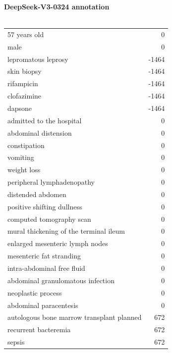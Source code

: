 \begin{figure}[!htbp]
    \begin{minipage}[!htbp]{0.49\textwidth}
    \footnotesize
        \textbf{DeepSeek-V3-0324 annotation} \\ \\
        \footnotesize
        \begin{tabular}{P{0.75\textwidth}r}
            57 years old & 0 \\
            male & 0 \\
            lepromatous leprosy & -1464 \\
            skin biopsy & -1464 \\
            rifampicin & -1464 \\
            clofazimine & -1464 \\
            dapsone & -1464 \\
            admitted to the hospital & 0 \\
            abdominal distension & 0 \\
            constipation & 0 \\
            vomiting & 0 \\
            weight loss & 0 \\
            peripheral lymphadenopathy & 0 \\
            distended abdomen & 0 \\
            positive shifting dullness & 0 \\
            computed tomography scan & 0 \\
            mural thickening of the terminal ileum & 0 \\
            enlarged mesenteric lymph nodes & 0 \\
            mesenteric fat stranding & 0 \\
            intra-abdominal free fluid & 0 \\
            abdominal granulomatous infection & 0 \\
            neoplastic process & 0 \\
            abdominal paracentesis & 0 \\
            autologous bone marrow transplant planned & 672 \\
            recurrent bacteremia & 672 \\
            sepsis & 672 \\

\end{tabular}
\end{minipage}
\end{figure}
